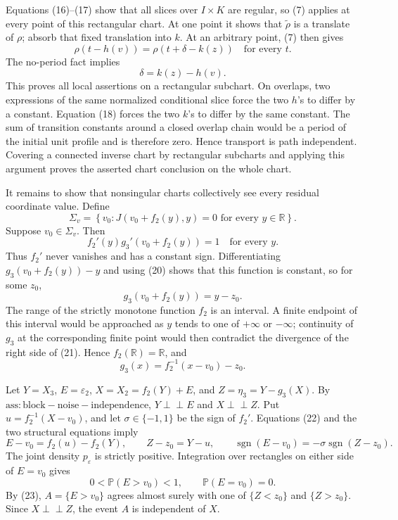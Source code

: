 Equations (16)--(17) show that all slices over \(I\times K\) are regular, so (7) applies at every point of this rectangular chart.  At one point it shows that \(\widetilde\rho\) is a translate of \(\rho\); absorb that fixed translation into \(k\).  At an arbitrary point, (7) then gives
\[
 \rho(t-h(v))=\rho(t+\delta-k(z))\quad\text{for every }t.
\]
The no-period fact implies
\[
 \delta=k(z)-h(v).
\tag{18}
\]
This proves all local assertions on a rectangular subchart.  On overlaps, two expressions of the same normalized conditional slice force the two \(h\)'s to differ by a constant.  Equation (18) forces the two \(k\)'s to differ by the same constant.  The sum of transition constants around a closed overlap chain would be a period of the initial unit profile and is therefore zero.  Hence transport is path independent.  Covering a connected inverse chart by rectangular subcharts and applying this argument proves the asserted chart conclusion on the whole chart.

It remains to show that nonsingular charts collectively see every residual coordinate value.  Define
\[
 \Sigma_v=\left\{v_0:J(v_0+f_2(y),y)=0\text{ for every }y\in\mathbb R\right\}.
\tag{19}
\]
Suppose \(v_0\in\Sigma_v\).  Then
\[
 f_2'(y)g_3'(v_0+f_2(y))=1\quad\text{for every }y.
\tag{20}
\]
Thus \(f_2'\) never vanishes and has a constant sign.  Differentiating \(g_3(v_0+f_2(y))-y\) and using (20) shows that this function is constant, so for some \(z_0\),
\[
 g_3(v_0+f_2(y))=y-z_0.
\tag{21}
\]
The range of the strictly monotone function \(f_2\) is an interval.  A finite endpoint of this interval would be approached as \(y\) tends to one of \(+\infty\) or \(-\infty\); continuity of \(g_3\) at the corresponding finite point would then contradict the divergence of the right side of (21).  Hence \(f_2(\mathbb R)=\mathbb R\), and
\[
 g_3(x)=f_2^{-1}(x-v_0)-z_0.
\tag{22}
\]

Let \(Y=X_3\), \(E=\varepsilon_2\), \(X=X_2=f_2(Y)+E\), and \(Z=\eta_3=Y-g_3(X)\).  By \(\mathrm{ass:block-noise-independence}\), \(Y\perp\!\!\!\perp E\) and \(X\perp\!\!\!\perp Z\).  Put \(u=f_2^{-1}(X-v_0)\), and let \(\sigma\in\{-1,1\}\) be the sign of \(f_2'\).  Equations (22) and the two structural equations imply
\[
 E-v_0=f_2(u)-f_2(Y),
 \qquad Z-z_0=Y-u,
 \qquad \operatorname{sgn}(E-v_0)=-\sigma\operatorname{sgn}(Z-z_0).
\tag{23}
\]
The joint density \(p_\varepsilon\) is strictly positive.  Integration over rectangles on either side of \(E=v_0\) gives
\[
 0<\mathbb P(E>v_0)<1,
 \qquad \mathbb P(E=v_0)=0.
\tag{24}
\]
By (23), \(A=\{E>v_0\}\) agrees almost surely with one of \(\{Z<z_0\}\) and \(\{Z>z_0\}\).  Since \(X\perp\!\!\!\perp Z\), the event \(A\) is independent of \(X\).

